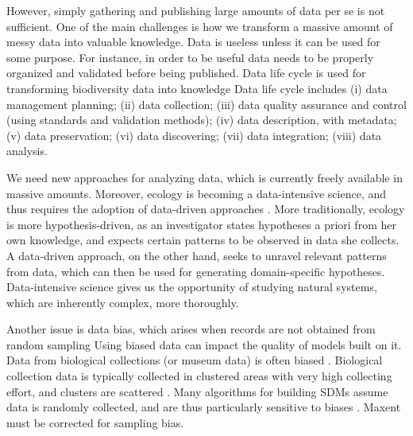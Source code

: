 However, simply gathering and publishing large amounts of data per se is not sufficient.
One of the main challenges is how we transform a massive amount of messy data into valuable knowledge.
Data is useless unless it can be used for some purpose.
For instance, in order to be useful data needs to be properly organized and validated before being published.
Data life cycle is used for transforming biodiversity data into knowledge \cite{Michener2012}
Data life cycle includes (i) data management planning; (ii) data collection; (iii) data quality assurance and control (using standards and validation methods); (iv) data description, with metadata; (v) data preservation; (vi) data discovering; (vii) data integration; (viii) data analysis. 


We need new approaches for analyzing data, which is currently freely available in massive amounts.
Moreover, ecology is becoming a data-intensive science, and thus requires the adoption of data-driven approaches \cite{Kelling2009}.
More traditionally, ecology is more hypothesis-driven, as an investigator states hypotheses a priori from her own knowledge, and expects certain patterns to be observed in data she collects.
A data-driven approach, on the other hand, seeks to unravel relevant patterns from data, which can then be used for generating domain-specific hypotheses.
Data-intensive science gives us the opportunity of studying natural systems, which are inherently complex, more thoroughly.


Another issue is data bias, which arises when records are not obtained from random sampling \cite{Daru2017}
Using biased data can impact the quality of models built on it.
Data from biological collections (or museum data) is often biased \cite{Daru2017}.
Biological collection data is typically collected in clustered areas with very high collecting effort, and clusters are scattered \cite{VanGemerden2005}.
Many algorithms for building SDMs assume data is randomly collected, and are thus particularly sensitive to biases \cite{Araujo2016} .
Maxent must be corrected for sampling bias.%



